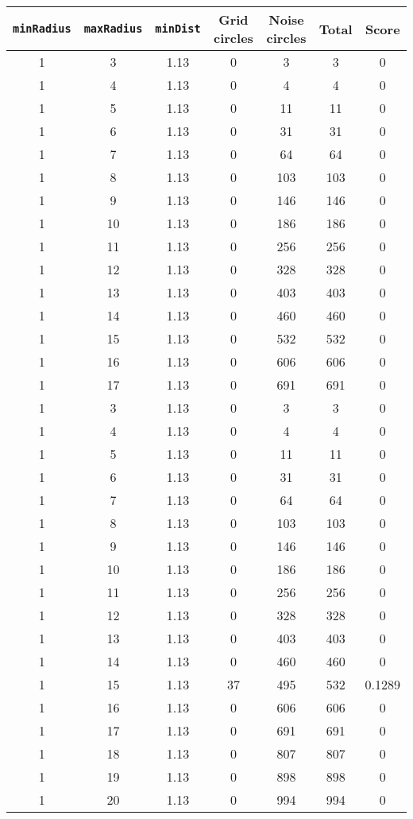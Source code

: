 \documentclass[letterpaper, 12pt]{article}
\begin{document}
\begin{longtable}{|c|c|c|c|c|c|c|}
\hline
\textbf{\texttt{minRadius}} & \textbf{\texttt{maxRadius}} & \textbf{\texttt{minDist}} & \textbf{Grid circles} & \textbf{Noise circles} & \textbf{Total} & \textbf{Score} \\
\hline
1 & 3 & 1.13 & 0 & 3 & 3 & 0 \\
\hline
1 & 4 & 1.13 & 0 & 4 & 4 & 0 \\
\hline
1 & 5 & 1.13 & 0 & 11 & 11 & 0 \\
\hline
1 & 6 & 1.13 & 0 & 31 & 31 & 0 \\
\hline
1 & 7 & 1.13 & 0 & 64 & 64 & 0 \\
\hline
1 & 8 & 1.13 & 0 & 103 & 103 & 0 \\
\hline
1 & 9 & 1.13 & 0 & 146 & 146 & 0 \\
\hline
1 & 10 & 1.13 & 0 & 186 & 186 & 0 \\
\hline
1 & 11 & 1.13 & 0 & 256 & 256 & 0 \\
\hline
1 & 12 & 1.13 & 0 & 328 & 328 & 0 \\
\hline
1 & 13 & 1.13 & 0 & 403 & 403 & 0 \\
\hline
1 & 14 & 1.13 & 0 & 460 & 460 & 0 \\
\hline
1 & 15 & 1.13 & 0 & 532 & 532 & 0 \\
\hline
1 & 16 & 1.13 & 0 & 606 & 606 & 0 \\
\hline
1 & 17 & 1.13 & 0 & 691 & 691 & 0 \\
\hline
1 & 3 & 1.13 & 0 & 3 & 3 & 0 \\
\hline
1 & 4 & 1.13 & 0 & 4 & 4 & 0 \\
\hline
1 & 5 & 1.13 & 0 & 11 & 11 & 0 \\
\hline
1 & 6 & 1.13 & 0 & 31 & 31 & 0 \\
\hline
1 & 7 & 1.13 & 0 & 64 & 64 & 0 \\
\hline
1 & 8 & 1.13 & 0 & 103 & 103 & 0 \\
\hline
1 & 9 & 1.13 & 0 & 146 & 146 & 0 \\
\hline
1 & 10 & 1.13 & 0 & 186 & 186 & 0 \\
\hline
1 & 11 & 1.13 & 0 & 256 & 256 & 0 \\
\hline
1 & 12 & 1.13 & 0 & 328 & 328 & 0 \\
\hline
1 & 13 & 1.13 & 0 & 403 & 403 & 0 \\
\hline
1 & 14 & 1.13 & 0 & 460 & 460 & 0 \\
\hline
1 & 15 & 1.13 & 37 & 495 & 532 & 0.1289 \\
\hline
1 & 16 & 1.13 & 0 & 606 & 606 & 0 \\
\hline
1 & 17 & 1.13 & 0 & 691 & 691 & 0 \\
\hline
1 & 18 & 1.13 & 0 & 807 & 807 & 0 \\
\hline
1 & 19 & 1.13 & 0 & 898 & 898 & 0 \\
\hline
1 & 20 & 1.13 & 0 & 994 & 994 & 0 \\
\hline
\end{longtable}
\end{document}
